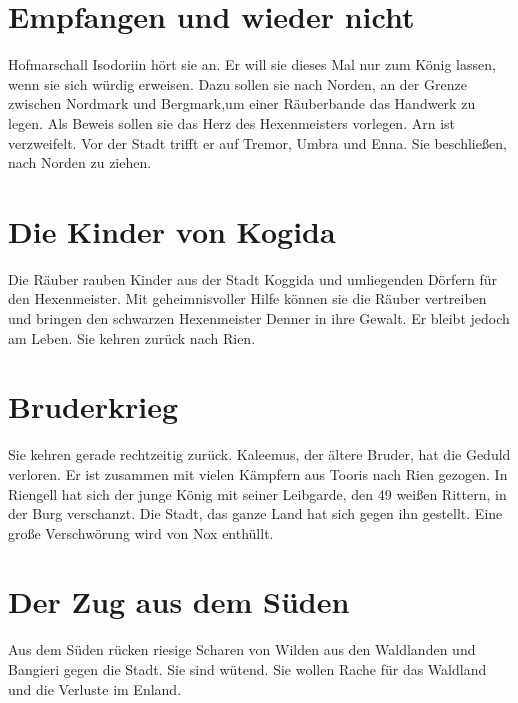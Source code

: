 \documentclass[12pt,a4paper,onecolumn,twoside,ngerman]{book}
\newcommand{\Bangiri}{Bangieri}
\newcommand{\Enland}{Enland}
\newcommand{\Nox}{Nox}
\newcommand{\Umbra}{Umbra}
\newcommand{\Enna}{Enna}
\newcommand{\Tremor}{Tremor}
\newcommand{\Nordmark}{Nordmark}
\newcommand{\Bergmark}{Bergmark}
\newcommand{\Arn}{Arn}
\newcommand{\Rhingell}{Riengell}
\newcommand{\Rhin}{Rien}
\newcommand{\Kalemus}{Kaleemus}
\newcommand{\Isodoriin}{Isodoriin}
\newcommand{\Kogida}{Koggida}
\newcommand{\Denner}{Denner}
\newcommand{\Toris}{Tooris}
\begin{document}
{%

\section{Empfangen und wieder nicht}
Hofmarschall {\Isodoriin} hört sie an. Er will sie dieses Mal nur zum König lassen, wenn sie sich würdig erweisen. Dazu sollen sie nach Norden, an der Grenze zwischen {\Nordmark} und {\Bergmark},um einer Räuberbande das Handwerk zu legen. Als Beweis sollen sie das Herz des Hexenmeisters vorlegen.\linebreak
{\Arn} ist verzweifelt. Vor der Stadt trifft er auf {\Tremor}, {\Umbra} und {\Enna}. Sie beschließen, nach Norden zu ziehen.

\section{Die Kinder von Kogida}
Die Räuber rauben Kinder aus der Stadt {\Kogida} und umliegenden Dörfern für den Hexenmeister. Mit geheimnisvoller Hilfe können sie die Räuber vertreiben und bringen den schwarzen Hexenmeister {\Denner} in ihre Gewalt. Er bleibt jedoch am Leben. Sie kehren zurück nach {\Rhin}.

\section{Bruderkrieg}
Sie kehren gerade rechtzeitig zurück. {\Kalemus}, der ältere Bruder, hat die Geduld verloren. Er ist zusammen mit vielen Kämpfern aus {\Toris} nach {\Rhin} gezogen. In {\Rhingell} hat sich der junge König mit seiner Leibgarde, den 49 weißen Rittern, in der Burg verschanzt. Die Stadt, das ganze Land hat sich gegen ihn gestellt.\linebreak
Eine große Verschwörung wird von {\Nox} enthüllt.

\section{Der Zug aus dem Süden}
Aus dem Süden rücken riesige Scharen von Wilden aus den Waldlanden und {\Bangiri} gegen die Stadt. Sie sind wütend. Sie wollen Rache für das Waldland und die Verluste im {\Enland}.

}
\end{document}
